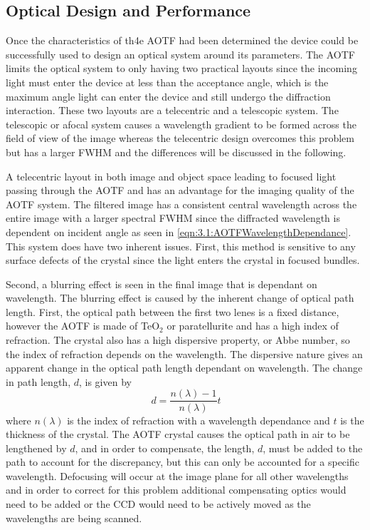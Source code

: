 \documentclass[12pt]{article}
\begin{document}
\subsection{Optical Design and Performance}

Once the characteristics of th4e AOTF had been determined the device could be successfully used to design an optical system around its parameters. The AOTF limits the optical system to only having two practical layouts since the incoming light must enter the device at less than the acceptance angle, which is the maximum angle light can enter the device and still undergo the diffraction interaction. These two layouts are a telecentric and a telescopic system. The telescopic or afocal system causes a wavelength gradient to be formed across the field of view of the image whereas the telecentric design overcomes this problem but has a larger FWHM \citep{Suhre2004} and the differences will be discussed in the following.

A telecentric layout in both image and object space leading to focused light passing through the AOTF and has an advantage for the imaging quality of the AOTF system. The filtered image has a consistent central wavelength across the entire image with a larger spectral FWHM since the diffracted wavelength is dependent on incident angle as seen in \autoref{eqn:3.1:AOTFWavelengthDependance}. This system does have two inherent issues. First, this method is sensitive to any surface defects of the crystal since the light enters the crystal in focused bundles.

Second, a blurring effect is seen in the final image that is dependant on wavelength. The blurring effect is caused by the inherent change of optical path length. First, the optical path between the first two lenes is a fixed distance, however the AOTF is made of TeO$_{2}$ or paratellurite and has a high index of refraction. The crystal also has a high dispersive property, or Abbe number, so the index of refraction depends on the wavelength. The dispersive nature gives an apparent change in the optical path length dependant on wavelength. The change in path length, $d$, is given by
\begin{equation}
    \ d = \frac{n(\lambda)-1}{n(\lambda)}t
    \label{eqn:3.2:opticalPathDisplacement}
\end{equation}
where $n(\lambda)$ is the index of refraction with a wavelength dependance and $t$ is the thickness of the crystal. The AOTF crystal causes the optical path in air to be lengthened by $d$, and in order to compensate, the length, $d$, must be added to the path to account for the discrepancy, but this can only be accounted for a specific wavelength. Defocusing will occur at the image plane for all other wavelengths and in order to correct for this problem additional compensating optics would need to be added or the CCD would need to be actively moved as the wavelengths are being scanned.
\end{document}
